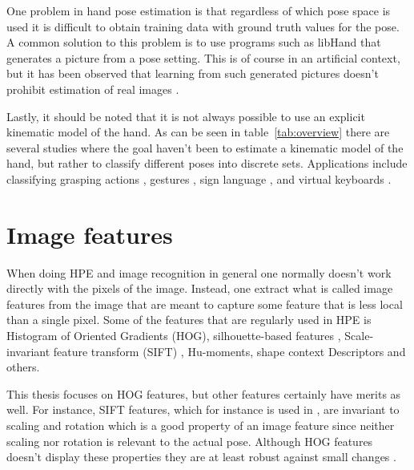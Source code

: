 \documentclass[a4paper,11pt]{kth-mag}
\begin{document}
One problem in hand pose estimation is that regardless of which pose space is used it is difficult to obtain training data with ground truth values for the pose.
A common solution to this problem is to use programs such as libHand \cite{libhand} that generates a picture from a pose setting.
This is of course in an artificial context, but it has been observed that learning from such generated pictures doesn't prohibit estimation of real images \cite{regressionBased}.

Lastly, it should be noted that it is not always possible to use an explicit kinematic model of the hand.
As can be seen in table~\ref{tab:overview} there are several studies where the goal haven't been to estimate a kinematic model of the hand, but rather to classify different poses into discrete sets.
Applications include classifying grasping actions \cite{cyberglove}, gestures \cite{tracking}, sign language \cite{signs}, and virtual keyboards \cite{keyboard}.

\section{Image features}
\label{sec:feature}
When doing HPE and image recognition in general one normally doesn't work directly with the pixels of the image.
Instead, one extract what is called image features from the image that are meant to capture some feature that is less local than a single pixel.
Some of the features that are regularly used in HPE is Histogram of Oriented Gradients (HOG)\cite{HOG,monocular,3Dhuman}, silhouette-based features \cite{fullDOF}, Scale-invariant feature transform (SIFT) \cite{SIFT},  Hu-moments, shape context Descriptors \cite{shape,recovering3D,regressionBased} and others.  

This thesis focuses on HOG features, but other features certainly have merits as well.
For instance, SIFT features, which for instance is used in \cite{SIFT}, are invariant to scaling and rotation which is a good property of an image feature since neither scaling nor rotation is relevant to the actual pose. 
Although HOG features doesn't display these properties they are at least robust against small changes \cite{monocular}.
\end{document}
